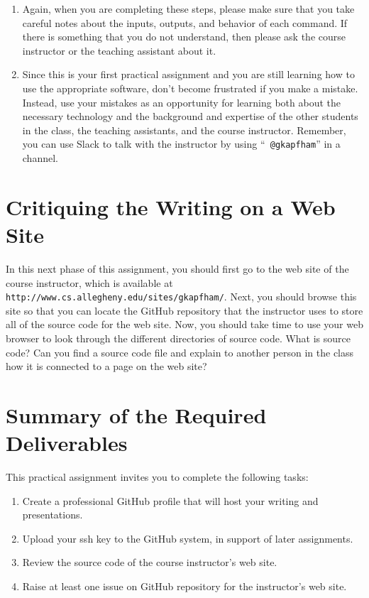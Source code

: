 \begin{enumerate}
  \item Again, when you are completing these steps, please make sure that you take careful notes about the inputs,
    outputs, and behavior of each command. If there is something that you do not understand, then please ask the course
    instructor or the teaching assistant about it.

  \item Since this is your first practical assignment and you are still learning how to use the appropriate software,
    don't become frustrated if you make a mistake. Instead, use your mistakes as an opportunity for learning both about
    the necessary technology and the background and expertise of the other students in the class, the teaching
    assistants, and the course instructor. Remember, you can use Slack to talk with the instructor by using ``{\tt
    @gkapfham}'' in a channel.

\end{enumerate}

\section*{Critiquing the Writing on a Web Site}

In this next phase of this assignment, you should first go to the web site of the course instructor, which is available
at {\tt http://www.cs.allegheny.edu/sites/gkapfham/}. Next, you should browse this site so that you can locate the
GitHub repository that the instructor uses to store all of the source code for the web site. Now, you should take time
to use your web browser to look through the different directories of source code. What is source code? Can you find a
source code file and explain to another person in the class how it is connected to a page on the web site?

\vspace*{-.1in}
\section*{Summary of the Required Deliverables}

This practical assignment invites you to complete the following tasks:

\vspace*{-.1in}
\begin{enumerate}
  \setlength{\itemsep}{0in}

  \item Create a professional GitHub profile that will host your writing and presentations.
  \item Upload your ssh key to the GitHub system, in support of later assignments.
  \item Review the source code of the course instructor's web site.
  \item Raise at least one issue on GitHub repository for the instructor's web site.

\end{enumerate}
\vspace*{-.1in}

